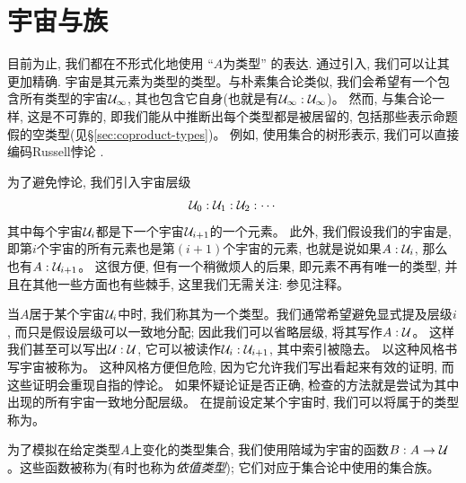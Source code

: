 %
%

\section{宇宙与族}
\label{sec:universes}

目前为止, 我们都在不形式化地使用 ``$A$为类型'' 的表达. 通过引入, 我们可以让其更加精确.
%
%
宇宙是其元素为类型的类型。与朴素集合论类似, 我们会希望有一个包含所有类型的宇宙$\mathcal{U}_\infty$, 其也包含它自身(也就是有$\mathcal{U}_\infty : \mathcal{U}_\infty$)。
然而, 与集合论一样, 这是不可靠的, 即我们能从中推断出每个类型都是被居留的, 包括那些表示命题假的空类型(见\S\ref{sec:coproduct-types})。
例如, 使用集合的树形表示, 我们可以直接编码Russell悖论 \cite{coquand:paradox}.

为了避免悖论, 我们引入宇宙层级
%
\[ \mathcal{U}_0 : \mathcal{U}_1 : \mathcal{U}_2 : \cdots \]
其中每个宇宙$\mathcal{U}_i$都是下一个宇宙$\mathcal{U}_{i+1}$的一个元素。
此外, 我们假设我们的宇宙是,
%
%
即第$i$个宇宙的所有元素也是第$(i+1)$个宇宙的元素, 也就是说如果$A:\mathcal{U}_i$, 那么也有$A:\mathcal{U}_{i+1}$。
这很方便, 但有一个稍微烦人的后果, 即元素不再有唯一的类型, 并且在其他一些方面也有些棘手, 这里我们无需关注: 参见注释。

当$A$居于某个宇宙$\mathcal{U}_i$中时, 我们称其为一个类型。我们通常希望避免显式提及层级$i$, 
%
%
%
而只是假设层级可以一致地分配; 因此我们可以省略层级, 将其写作$A:\mathcal{U}$。
这样我们甚至可以写出$\mathcal{U}:\mathcal{U}$, 它可以被读作$\mathcal{U}_i:\mathcal{U}_{i+1}$, 其中索引被隐去。
以这种风格书写宇宙被称为。
%
这种风格方便但危险, 因为它允许我们写出看起来有效的证明, 而这些证明会重现自指的悖论。
如果怀疑论证是否正确, 检查的方法就是尝试为其中出现的所有宇宙一致地分配层级。
在提前设定某个宇宙\UU 时, 我们可以将属于\UU 的类型称为。
%
%

为了模拟在给定类型$A$上变化的类型集合, 我们使用陪域为宇宙的函数$B : A \to \mathcal{U}$。这些函数被称为(有时也称为\emph{依值类型}); 
%
%
%
%
它们对应于集合论中使用的集合族。

